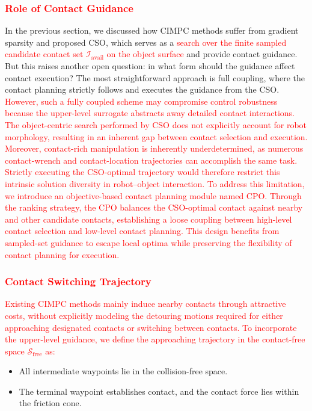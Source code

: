 \subsubsection{\textcolor{red}{Role of Contact Guidance}}
In the previous section, we discussed how CIMPC methods suffer from gradient sparsity and proposed CSO, which serves as a \textcolor{red}{search over the finite sampled candidate contact set $\mathcal{I}_{\text{avail}}$ on the object surface} and provide contact guidance. But this raises another open question: in what form should the guidance affect contact execution? The most straightforward approach is full coupling, where the contact planning strictly follows and executes the guidance from the CSO. \textcolor{red}{However, such a fully coupled scheme may compromise control robustness because the upper-level surrogate abstracts away detailed contact interactions. The object-centric search performed by CSO does not explicitly account for robot morphology, resulting in an inherent gap between contact selection and execution. Moreover, contact-rich manipulation is inherently underdetermined, as numerous contact-wrench and contact-location trajectories can accomplish the same task. Strictly executing the CSO-optimal trajectory would therefore restrict this intrinsic solution diversity in robot–object interaction. To address this limitation, we introduce an objective-based contact planning module named CPO. Through the ranking strategy, the CPO balances the CSO-optimal contact against nearby and other candidate contacts, establishing a loose coupling between high-level contact selection and low-level contact planning. This design benefits from sampled-set guidance to escape local optima while preserving the flexibility of contact planning for execution.}

\subsubsection{\textcolor{red}{Contact Switching Trajectory}}\label{sec:feasible_contact_trajectory}

\textcolor{red}{Existing CIMPC methods mainly induce nearby contacts through attractive costs, without explicitly modeling the detouring motions required for either approaching designated contacts or switching between contacts. To incorporate the upper-level guidance, we define the approaching trajectory in the contact-free space $\mathcal{S}_{\mathrm{free}}$ as:}
\begin{itemize}
\item All intermediate waypoints lie in the collision-free space.
\item The terminal waypoint establishes contact, and the contact force lies within the friction cone.
\end{itemize}

